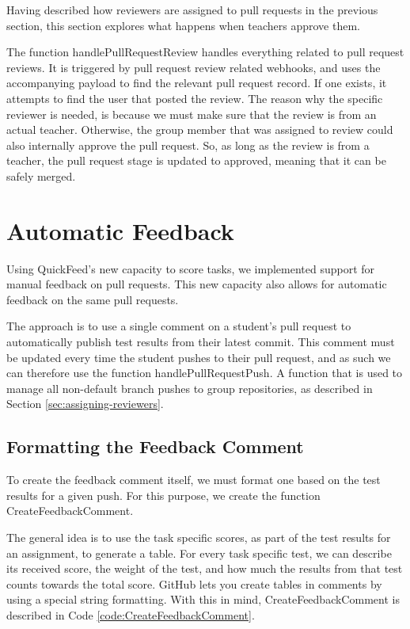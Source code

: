 Having described how reviewers are assigned to pull requests in the previous section, this section explores what happens when teachers approve them.

The function handlePullRequestReview handles everything related to pull request reviews.
It is triggered by pull request review related webhooks, and uses the accompanying payload to find the relevant pull request record.
If one exists, it attempts to find the user that posted the review.
The reason why the specific reviewer is needed, is because we must make sure that the review is from an actual teacher.
Otherwise, the group member that was assigned to review could also internally approve the pull request.
So, as long as the review is from a teacher, the pull request stage is updated to approved, meaning that it can be safely merged.

\section{Automatic Feedback}

Using QuickFeed's new capacity to score tasks, we implemented support for manual feedback on pull requests.
This new capacity also allows for automatic feedback on the same pull requests.

The approach is to use a single comment on a student's pull request to automatically publish test results from their latest commit.
This comment must be updated every time the student pushes to their pull request, and as such we can therefore use the function handlePullRequestPush.
A function that is used to manage all non-default branch pushes to group repositories, as described in Section \ref{sec:assigning-reviewers}.

\subsection{Formatting the Feedback Comment}

To create the feedback comment itself, we must format one based on the test results for a given push.
For this purpose, we create the function CreateFeedbackComment.

The general idea is to use the task specific scores, as part of the test results for an assignment, to generate a table.
For every task specific test, we can describe its received score, the weight of the test, and how much the results from that test counts towards the total score.
GitHub lets you create tables in comments by using a special string formatting.
With this in mind, CreateFeedbackComment is described in Code \ref{code:CreateFeedbackComment}.

